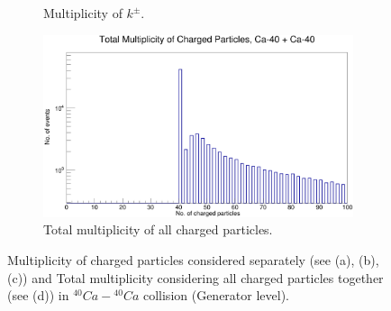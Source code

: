 \documentclass[12pt, twocolumn]{article}
\begin{document}
\begin{figure}[h]
\begin{subfigure}[h]{0.49\textwidth}
\caption{Multiplicity of $k^{\pm}$.}
\label{Multiplicity of kaons Ca40.}
\end{subfigure}
\hfill
\begin{subfigure}[h]{0.49\textwidth}
\centering
\includegraphics[scale=0.14]{GeneratorTotalMultiplicity_Ca40.png}
\caption{Total multiplicity of all charged particles.}
\label{Total multiplicity of all charged particles Ca40.}
\end{subfigure}
\caption{Multiplicity of charged particles considered separately (see (a), (b), (c)) and Total multiplicity considering all charged particles together (see (d)) in $^{40}Ca-{^{40}Ca}$ collision (Generator level).}
\label{Multiplicity of charged particles considered separately and Total multiplicity considering all charged particles together in Ca40-Ca40 collision (Generator stage).}
\end{figure}
\end{document}
